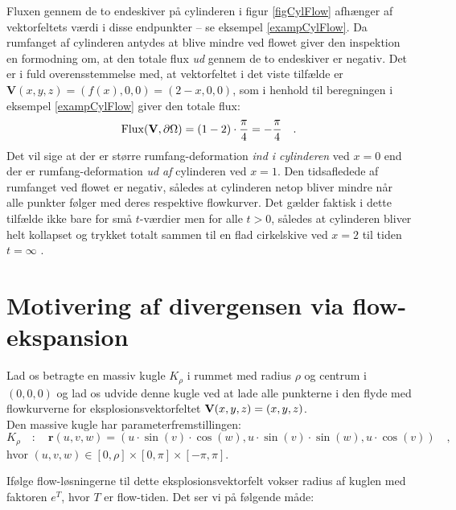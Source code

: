 \begin{aha}
Fluxen gennem de to endeskiver på cylinderen i figur \ref{figCylFlow} afhænger af vektorfeltets værdi i disse endpunkter -- se eksempel \ref{exampCylFlow}. Da rumfanget af cylinderen antydes at blive mindre ved flowet giver den inspektion en formodning om, at den totale flux {\emph{ud}} gennem de to endeskiver er negativ. Det er i fuld overensstemmelse med, at vektorfeltet i det viste tilfælde er $\mathbf{V}(x,y,z) = (f(x), 0,0) = (2-x, 0,0)$, som i henhold til beregningen i eksempel \ref{exampCylFlow} giver den totale flux:
\begin{equation}
\operatorname{Flux}(\mathbf{V}, \partial \Omega) = (1 - 2) \cdot \frac{\pi}{4} = - \frac{\pi}{4} \quad .
\end{equation}
Det vil sige at der er større rumfang-deformation \emph{ind i cylinderen} ved $x=0$ end der er rumfang-deformation \emph{ud af} cylinderen ved $x=1$. Den tidsafledede af rumfanget ved flowet er negativ, således at cylinderen netop bliver mindre når alle punkter følger med deres respektive flowkurver. Det gælder faktisk i dette tilfælde ikke bare for små $t$-værdier men for alle $t > 0$, således at cylinderen bliver  helt kollapset og trykket totalt sammen til en flad cirkelskive ved $x=2$ til tiden $t=\infty$ .
\end{aha}




\section{Motivering af divergensen via flow-ekspansion}
Lad os betragte en massiv kugle $K_{\rho}$ i
rummet med radius $\rho$ og  centrum i $(0,0,0)$
og lad os udvide denne kugle ved at lade alle
punkterne i den flyde med flowkurverne for
eksplosionsvektorfeltet ${\bf{V}}(x,y,z) = (x, y,
z)$. \\

Den massive kugle har parameterfremstillingen:
\begin{equation}
K_{\rho} \quad : \quad \mathbf{r}(u,v,w) = (u\cdot\sin(v)\cdot \cos(w), u\cdot \sin(v)\cdot \sin(w), u\cdot \cos(v)) \quad ,
\end{equation}
hvor  $(u,v,w) \in [0, \rho]\times [0, \pi] \times [-\pi, \pi]$.


Ifølge flow-løsningerne til dette eksplosionsvektorfelt
vokser radius af kuglen
med faktoren $e^{T}$, hvor $T$ er flow-tiden. Det ser vi på følgende måde:\\

